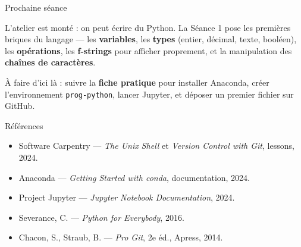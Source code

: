 \documentclass[aspectratio=169,11pt]{beamer}
\begin{document}
\begin{frame}{Prochaine séance}
\begin{ucaddef}
{\small L'atelier est monté : on peut écrire du Python. La Séance 1 pose les premières briques du langage — les \textbf{variables}, les \textbf{types} (entier, décimal, texte, booléen), les \textbf{opérations}, les \textbf{f-strings} pour afficher proprement, et la manipulation des \textbf{chaînes de caractères}.}
\end{ucaddef}
{\small À faire d'ici là : suivre la \textbf{fiche pratique} pour installer Anaconda, créer l'environnement \texttt{prog-python}, lancer Jupyter, et déposer un premier fichier sur GitHub.}
\end{frame}

\begin{frame}{Références}
\begin{itemize}\small
  \item Software Carpentry — \emph{The Unix Shell} et \emph{Version Control with Git}, lessons, 2024.
  \item Anaconda — \emph{Getting Started with conda}, documentation, 2024.
  \item Project Jupyter — \emph{Jupyter Notebook Documentation}, 2024.
  \item Severance, C. — \emph{Python for Everybody}, 2016.
  \item Chacon, S., Straub, B. — \emph{Pro Git}, 2e éd., Apress, 2014.
\end{itemize}
\end{frame}
\end{document}
